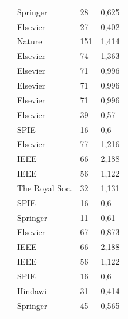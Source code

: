 \documentclass[preprint,12pt,authoryear]{elsarticle}
\begin{document}
\begin{longtable}{p{6.5cm}p{3.5cm}p{0.3cm}p{0.5cm}}
            \citet{FENG2018}              & Springer                & 28  & 0,625 \\
            \citet{PAN2018}               & Elsevier                & 27  & 0,402 \\
            \citet{HAN2017}               & Nature                  & 151 & 1,414 \\
            \citet{ZHENG2017}             & Elsevier                & 74  & 1,363 \\
            \citet{WAN2017a}              & Elsevier                & 71  & 0,996 \\
            \citet{PAN2017}               & Elsevier                & 71  & 0,996 \\
            \citet{WAN2017b}              & Elsevier                & 71  & 0,996 \\
            \citet{WAHAB2017}             & Elsevier                & 39  & 0,57  \\
            \citet{BEJNORDI2017}          & SPIE                    & 16  & 0,6   \\
            \citet{KRAWCZYK2016}          & Elsevier                & 77  & 1,216 \\
            \citet{XU2016}                & IEEE                    & 66  & 2,188 \\
            \citet{ZHANG2016}             & IEEE                    & 56  & 1,122 \\
            \citet{CHAN2016}              & The Royal Soc.          & 32  & 1,131 \\
            \citet{BALAZSI2016}           & SPIE                    & 16  & 0,6   \\
            \citet{KORKMAZ2016}           & Springer                & 11  & 0,61  \\
            \citet{TASHK2015}             & Elsevier                & 67  & 0,873 \\
            \citet{ZHANG2015}             & IEEE                    & 66  & 2,188 \\
            \citet{KHAN2015}              & IEEE                    & 56  & 1,122 \\
            \citet{WANG2014}              & SPIE                    & 16  & 0,6   \\
            \citet{LOUKAS2013}            & Hindawi                 & 31  & 0,414 \\
            \citet{ISSACNIWAS2012}        & Springer                & 45  & 0,565 \\

\end{longtable}
\end{document}
